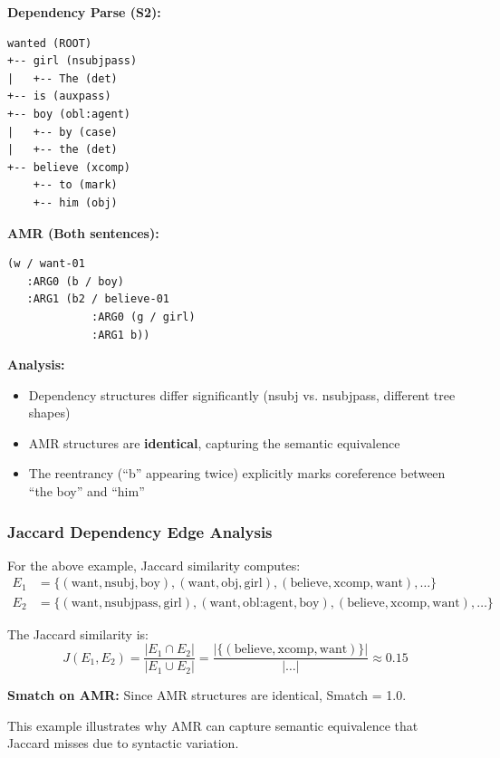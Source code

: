 \documentclass[11pt,a4paper]{article}
\begin{document}
\textbf{Dependency Parse (S2):}
\begin{verbatim}
wanted (ROOT)
+-- girl (nsubjpass)
|   +-- The (det)
+-- is (auxpass)
+-- boy (obl:agent)
|   +-- by (case)
|   +-- the (det)
+-- believe (xcomp)
    +-- to (mark)
    +-- him (obj)
\end{verbatim}

\textbf{AMR (Both sentences):}
\begin{verbatim}
(w / want-01
   :ARG0 (b / boy)
   :ARG1 (b2 / believe-01
             :ARG0 (g / girl)
             :ARG1 b))
\end{verbatim}

\textbf{Analysis:}
\begin{itemize}
    \item Dependency structures differ significantly (nsubj vs. nsubjpass, different tree shapes)
    \item AMR structures are \textbf{identical}, capturing the semantic equivalence
    \item The reentrancy (``b'' appearing twice) explicitly marks coreference between ``the boy'' and ``him''
\end{itemize}

\subsubsection{Jaccard Dependency Edge Analysis}

For the above example, Jaccard similarity computes:
\begin{align}
E_1 &= \{(\text{want}, \text{nsubj}, \text{boy}), (\text{want}, \text{obj}, \text{girl}), (\text{believe}, \text{xcomp}, \text{want}), \ldots\} \\
E_2 &= \{(\text{want}, \text{nsubjpass}, \text{girl}), (\text{want}, \text{obl:agent}, \text{boy}), (\text{believe}, \text{xcomp}, \text{want}), \ldots\}
\end{align}

The Jaccard similarity is:
\begin{equation}
J(E_1, E_2) = \frac{|E_1 \cap E_2|}{|E_1 \cup E_2|} = \frac{|\{(\text{believe}, \text{xcomp}, \text{want})\}|}{|\ldots|} \approx 0.15
\end{equation}

\textbf{Smatch on AMR:} Since AMR structures are identical, Smatch = 1.0.

This example illustrates why AMR can capture semantic equivalence that Jaccard misses due to syntactic variation.
\end{document}

